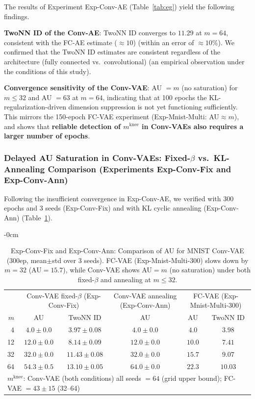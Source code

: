 \documentclass[make,article,submit,pdftex,moreauthors]{Definitions/mdpi}
\newcommand{\mknee}{m^{\mathrm{knee}}}
\begin{document}
The results of Experiment Exp-Conv-AE (Table~\ref{tab:eg}) yield the following findings.

\textbf{TwoNN ID of the Conv-AE}: TwoNN ID converges to $11.29$ at $m = 64$,
consistent with the FC-AE estimate ($\approx 10$) (within an error of $\approx 10\%$).
We confirmed that the TwoNN ID estimates are consistent regardless of the architecture
(fully connected vs.\ convolutional)
(an empirical observation under the conditions of this study).

\textbf{Convergence sensitivity of the Conv-VAE}: AU $= m$ (no saturation) for $m \leq 32$ and AU $= 63$ at $m = 64$,
indicating that at 100 epochs the KL-regularization-driven dimension suppression is not yet functioning sufficiently.
This mirrors the 150-epoch FC-VAE experiment (Exp-Mnist-Multi: AU$\approx m$), and shows that
\textbf{reliable detection of $\mknee$ in Conv-VAEs also requires a larger number of epochs}.

\subsubsection{Delayed AU Saturation in Conv-VAEs: Fixed-$\beta$ vs.\ KL-Annealing Comparison (Experiments Exp-Conv-Fix and Exp-Conv-Ann)}
\label{sec:exp_conv_300ep}

Following the insufficient convergence in Exp-Conv-AE, we verified with 300 epochs and 3 seeds (Exp-Conv-Fix)
and with KL cyclic annealing (Exp-Conv-Ann)
(Table~\ref{tab:eh_conv_vae}).

\begin{table}[H]
\begin{adjustwidth}{-\extralength}{0cm}
\centering
\caption{Exp-Conv-Fix and Exp-Conv-Ann: Comparison of AU for MNIST Conv-VAE (300ep, mean$\pm$std over 3 seeds). FC-VAE (Exp-Mnist-Multi-300) slows down by $m=32$ (AU$=15.7$), while Conv-VAE shows AU$=m$ (no saturation) under both fixed-$\beta$ and annealing at $m \leq 32$.}
\label{tab:eh_conv_vae}
\small
\begin{tabular}{r ccc cc}
\toprule
 & \multicolumn{2}{c}{Conv-VAE fixed-$\beta$ (Exp-Conv-Fix)} & \multicolumn{1}{c}{Conv-VAE annealing (Exp-Conv-Ann)} & \multicolumn{2}{c}{FC-VAE (Exp-Mnist-Multi-300)} \\
$m$ & AU & TwoNN ID & AU & AU & TwoNN ID \\
\midrule
 4 & $4.0\pm0.0$ & $3.97\pm0.08$ & $4.0\pm0.0$ & $4.0$ & $3.98$ \\
12 & $12.0\pm0.0$ & $8.14\pm0.09$ & $12.0\pm0.0$ & $10.0$ & $7.41$ \\
32 & $32.0\pm0.0$ & $11.43\pm0.08$ & $32.0\pm0.0$ & $15.7$ & $9.07$ \\
64 & $54.3\pm0.5$ & $13.10\pm0.05$ & $64.0\pm0.0$ & $22.3$ & $10.03$ \\
\midrule
\multicolumn{6}{l}{$\mknee$: Conv-VAE (both conditions) all seeds $=64$ (grid upper bound); FC-VAE $=43\pm15$ (32--64)} \\
\bottomrule
\end{tabular}
\end{adjustwidth}
\end{table}
\end{document}
